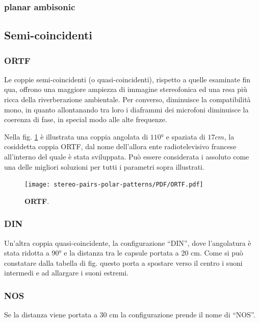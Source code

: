 \subsubsection*{planar ambisonic}
\subsection*{Semi-coincidenti}
\subsubsection*{ORTF}
Le coppie semi-coincidenti (o quasi-coincidenti), rispetto a quelle esaminate fin qua, offrono una
maggiore ampiezza di immagine stereofonica ed una resa più ricca della riverberazione
ambientale. Per converso, diminuisce la compatibilità mono, in quanto allontanando
tra loro i diaframmi dei microfoni diminuisce la coerenza di fase, in special
modo alle alte frequenze.

Nella fig. \ref{ORTF}
è illustrata una coppia angolata di $110°$ e spaziata
di $17cm$, la cosiddetta coppia ORTF, dal nome dell’allora ente radiotelevisivo
francese all’interno del quale è stata sviluppata. Può essere considerata i
assoluto come una delle migliori soluzioni per tutti i parametri sopra illustrati.
\begin{figure}[h]
\begin{center}
\texttt{[image: stereo-pairs-polar-patterns/PDF/ORTF.pdf]}
\caption{\textbf{ORTF}.}
\label{ORTF}
\end{center}
\end{figure}
\subsubsection*{DIN}
Un’altra coppia quasi-coincidente, la configurazione “DIN”, dove l’angolatura
è stata ridotta a 90° e la distanza tra le capsule portata a 20 cm. Come si può
constatare dalla tabella di fig. %
questo porta a
spostare verso il centro i suoni intermedi e ad allargare i suoni estremi.
\subsubsection*{NOS}
Se la distanza viene portata a 30 cm la configurazione prende il nome di “NOS”.
